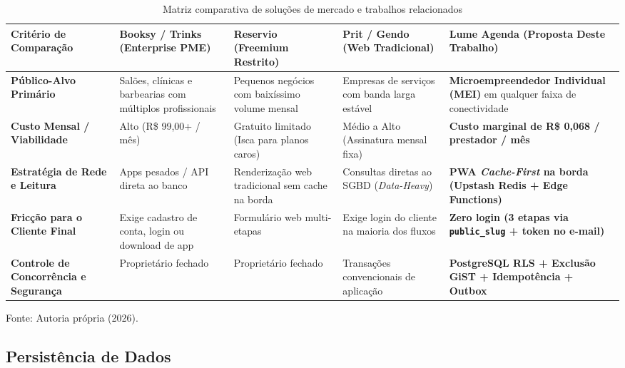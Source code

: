 \documentclass[12pt,a4paper]{article}
\begin{document}
\begin{table}[hbt]
\centering
\caption{Matriz comparativa de soluções de mercado e trabalhos relacionados}
\label{quadro:trabalhos_relacionados}
\footnotesize
\renewcommand{\arraystretch}{1.25}
\begin{tabularx}{\textwidth}{|p{2.9cm}|X|X|X|X|}
\hline
\textbf{Critério de Comparação} & \textbf{Booksy / Trinks (Enterprise PME)} & \textbf{Reservio (Freemium Restrito)} & \textbf{Prit / Gendo (Web Tradicional)} & \textbf{Lume Agenda (Proposta Deste Trabalho)} \\ \hline
\textbf{Público-Alvo Primário} & Salões, clínicas e barbearias com múltiplos profissionais & Pequenos negócios com baixíssimo volume mensal & Empresas de serviços com banda larga estável & \textbf{Microempreendedor Individual (MEI)} em qualquer faixa de conectividade \\ \hline
\textbf{Custo Mensal / Viabilidade} & Alto (R\$ 99,00+ / mês) & Gratuito limitado (Isca para planos caros) & Médio a Alto (Assinatura mensal fixa) & \textbf{Custo marginal de R\$ 0,068 / prestador / mês} \\ \hline
\textbf{Estratégia de Rede e Leitura} & Apps pesados / API direta ao banco & Renderização web tradicional sem cache na borda & Consultas diretas ao SGBD (\textit{Data-Heavy}) & \textbf{PWA \textit{Cache-First} na borda (Upstash Redis + Edge Functions)} \\ \hline
\textbf{Fricção para o Cliente Final} & Exige cadastro de conta, login ou download de app & Formulário web multi-etapas & Exige login do cliente na maioria dos fluxos & \textbf{Zero login (3 etapas via \texttt{public\_slug} + token no e-mail)} \\ \hline
\textbf{Controle de Concorrência e Segurança} & Proprietário fechado & Proprietário fechado & Transações convencionais de aplicação & \textbf{PostgreSQL RLS + Exclusão GiST + Idempotência + Outbox} \\ \hline
\end{tabularx}
\vspace{0.1cm}
{\footnotesize Fonte: Autoria própria (2026).}
\end{table}


\subsection{Persistência de Dados}
\label{subsec:persistencia_dados}
\end{document}
